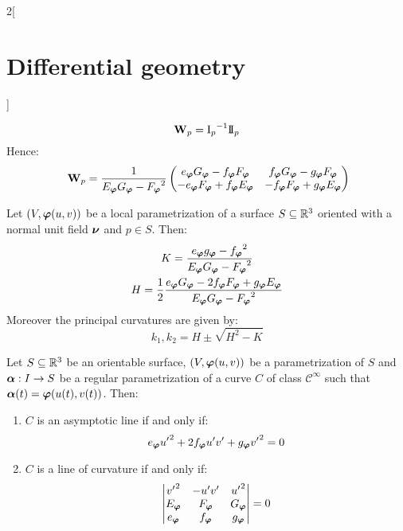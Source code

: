 \documentclass[../../../main.tex]{subfiles}
\begin{document}
\begin{multicols}{2}[\section{Differential geometry}]
\begin{proposition}
    $$\boldsymbol{\mathrm{W}}_p={\mathrm{I}_p}^{-1}\mathrm{I\!I}_p$$
    Hence: $$\boldsymbol{\mathrm{W}}_p=\frac{1}{E_{\boldsymbol{\mathrm{\varphi}}}G_{\boldsymbol{\mathrm{\varphi}}}-{F_{\boldsymbol{\mathrm{\varphi}}}}^2}
      \begin{pmatrix}
        e_{\boldsymbol{\mathrm{\varphi}}}G_{\boldsymbol{\mathrm{\varphi}}}-f_{\boldsymbol{\mathrm{\varphi}}}F_{\boldsymbol{\mathrm{\varphi}}}  & f_{\boldsymbol{\mathrm{\varphi}}}G_{\boldsymbol{\mathrm{\varphi}}}-g_{\boldsymbol{\mathrm{\varphi}}}F_{\boldsymbol{\mathrm{\varphi}}}  \\
        -e_{\boldsymbol{\mathrm{\varphi}}}F_{\boldsymbol{\mathrm{\varphi}}}+f_{\boldsymbol{\mathrm{\varphi}}}E_{\boldsymbol{\mathrm{\varphi}}} & -f_{\boldsymbol{\mathrm{\varphi}}}F_{\boldsymbol{\mathrm{\varphi}}}+g_{\boldsymbol{\mathrm{\varphi}}}E_{\boldsymbol{\mathrm{\varphi}}}
      \end{pmatrix}\!\!$$
  \end{proposition}
  \begin{corollary}
    Let $(V,\boldsymbol{\mathrm{\varphi}}(u,v))$ be a local parametrization of a surface $S\subseteq\mathbb{R}^3$ oriented with a normal unit field $\boldsymbol{\mathrm{\nu}}$ and $p\in S$. Then:
    \begin{gather*}
      K =\frac{e_{\boldsymbol{\mathrm{\varphi}}}g_{\boldsymbol{\mathrm{\varphi}}}-{f_{\boldsymbol{\mathrm{\varphi}}}}^2}{E_{\boldsymbol{\mathrm{\varphi}}}G_{\boldsymbol{\mathrm{\varphi}}}-{F_{\boldsymbol{\mathrm{\varphi}}}}^2}               \\
      H =\frac{1}{2}\frac{e_{\boldsymbol{\mathrm{\varphi}}}G_{\boldsymbol{\mathrm{\varphi}}}-2f_{\boldsymbol{\mathrm{\varphi}}}F_{\boldsymbol{\mathrm{\varphi}}}+g_{\boldsymbol{\mathrm{\varphi}}}E_{\boldsymbol{\mathrm{\varphi}}}}{E_{\boldsymbol{\mathrm{\varphi}}}G_{\boldsymbol{\mathrm{\varphi}}}-{F_{\boldsymbol{\mathrm{\varphi}}}}^2}
    \end{gather*}
    Moreover the principal curvatures are given by: $$k_1,k_2=H\pm\sqrt{H^2-K}$$
  \end{corollary}
  \begin{proposition}
    Let $S\subseteq\mathbb{R}^3$ be an orientable surface, $(V,\boldsymbol{\mathrm{\varphi}}(u,v))$ be a parametrization of $S$ and $\boldsymbol{\mathrm{\alpha}}:I\rightarrow S$ be a regular parametrization of a curve $C$ of class $\mathcal{C}^\infty$ such that $\boldsymbol{\mathrm{\alpha}}(t)=\boldsymbol{\mathrm{\varphi}}(u(t),v(t))$. Then:
    \begin{enumerate}
      \item $C$ is an asymptotic line if and only if: $$e_{\boldsymbol{\mathrm{\varphi}}}{u'}^2+2f_{\boldsymbol{\mathrm{\varphi}}}u'v'+g_{\boldsymbol{\mathrm{\varphi}}}{v'}^2=0$$
      \item $C$ is a line of curvature if and only if:
            $$
              \begin{vmatrix}
                {v'}^2         & -u'v'          & {u'}^2         \\
                E_{\boldsymbol{\mathrm{\varphi}}} & F_{\boldsymbol{\mathrm{\varphi}}} & G_{\boldsymbol{\mathrm{\varphi}}} \\
                e_{\boldsymbol{\mathrm{\varphi}}} & f_{\boldsymbol{\mathrm{\varphi}}} & g_{\boldsymbol{\mathrm{\varphi}}}
              \end{vmatrix}=0
            $$
    \end{enumerate}
  \end{proposition}

\end{multicols}
\end{document}
